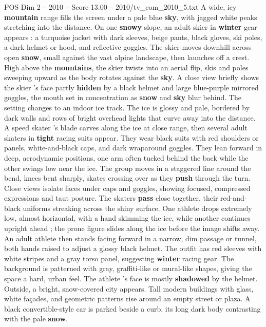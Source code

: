 \begin{textsample}{POS Dim 2 – 2010 – Score 13.00 – 2010/tv\_com\_2010\_5.txt}  \label{ex:f2_pos_060}
A wide, icy \textbf{mountain} range fills the screen under a pale blue \textbf{sky}, with jagged white peaks stretching into the distance.
On one \textbf{snowy} slope, an adult skier in \textbf{winter} gear appears : a turquoise jacket with dark sleeves, beige pants, black gloves, ski poles, a dark helmet or hood, and reflective goggles.
The skier moves downhill across open \textbf{snow}, small against the vast alpine landscape, then launches off a crest.
High above the \textbf{mountains}, the skier twists into an aerial flip, skis and poles sweeping upward as the body rotates against the \textbf{sky}.
A close view briefly shows the skier ’s face partly \textbf{hidden} by a black helmet and large blue-purple mirrored goggles, the mouth set in concentration as \textbf{snow} and \textbf{sky} blur behind.
The setting changes to an indoor ice track.
The ice is glossy and pale, bordered by dark walls and rows of bright overhead lights that curve away into the distance.
A speed skater ’s blade carves along the ice at close range, then several adult skaters in \textbf{tight} racing suits appear.
They wear black suits with red shoulders or panels, white-and-black caps, and dark wraparound goggles.
They lean forward in deep, aerodynamic positions, one arm often tucked behind the back while the other swings low near the ice.
The group moves in a staggered line around the bend, knees bent sharply, skates crossing over as they \textbf{push} through the turn.
Close views isolate faces under caps and goggles, showing focused, compressed expressions and taut posture.
The skaters \textbf{pass} close together, their red-and-black uniforms streaking across the shiny surface.
One athlete drops extremely low, almost horizontal, with a hand skimming the ice, while another continues upright ahead ; the prone figure slides along the ice before the image shifts away.
An adult athlete then stands facing forward in a narrow, dim passage or tunnel, both hands raised to adjust a glossy black helmet.
The outfit has red sleeves with white stripes and a gray torso panel, suggesting \textbf{winter} racing gear.
The background is patterned with gray, graffiti-like or mural-like shapes, giving the space a hard, urban feel.
The athlete ’s face is mostly \textbf{shadowed} by the helmet.
Outside, a bright, snow-covered city appears.
Tall modern buildings with glass, white façades, and geometric patterns rise around an empty street or plaza.
A black convertible-style car is parked beside a curb, its long dark body contrasting with the pale \textbf{snow}.

\end{textsample}
